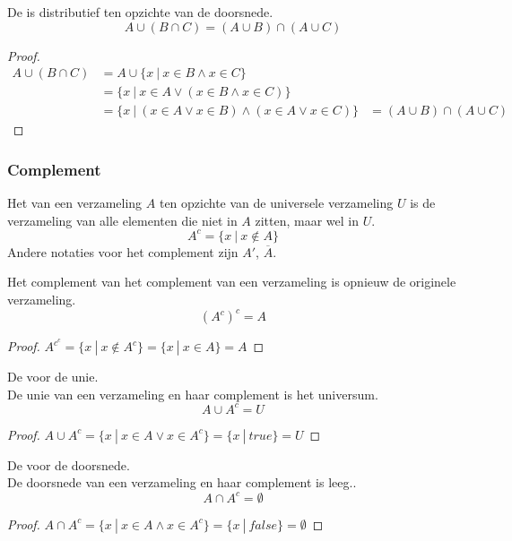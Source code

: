 \documentclass[main.tex]{subfiles}
\begin{document}
\begin{st}
  De  is distributief ten opzichte van de doorsnede.
  \[ A \cup ( B \cap C ) = (A \cup B) \cap (A \cup C) \]

  \begin{proof}
    \[
    \begin{array}{rll}
      A \cup ( B \cap C ) &= A \cup \{ x\ |\ x \in B \wedge x \in C \}&\\
                          &= \{ x\ |\ x \in A \vee (x \in B \wedge x \in C) \}&\\
                          &= \{ x\ |\ (x \in A \vee x\in B) \wedge (x \in A \vee x \in C) \} &= (A \cup B) \cap (A \cup C)      
    \end{array}
    \]
  \end{proof}
\end{st}

\subsubsection{Complement}
\label{sec:complement}

\begin{de}
  Het  van een verzameling $A$ ten opzichte van de universele verzameling $U$ is de verzameling van alle elementen die niet in $A$ zitten, maar wel in $U$.
  \[ A^{c} = \{ x\ |\ x \not\in A \} \]
  Andere notaties voor het complement zijn $A'$, $\overline{A}$. 
\end{de}

\begin{st}
  Het complement van het complement van een verzameling is opnieuw de originele verzameling.
  \[ (A^{c})^{c} = A\]
  \begin{proof}
    $A^{c^{c}} = \{ x\ |\ x \not\in A^{c} \} = \{ x\ |\ x \in A \} = A$
  \end{proof}
\end{st}

\begin{st}
  De  voor de unie.\\
  De unie van een verzameling en haar complement is het universum.
  \[ A \cup A^{c} = U \]
  \begin{proof}
    $A \cup A^{c} = \{ x\ |\ x \in A \vee x \in A^{c}\} = \{ x\ |\ true \} = U$
  \end{proof}
\end{st}

\begin{st}
  De  voor de doorsnede.\\
  De doorsnede van een verzameling en haar complement is leeg..
  \[ A \cap A^{c} = \emptyset \]

  \begin{proof}
    $A \cap A^{c} = \{ x\ |\ x \in A \wedge x \in A^{c} \} = \{ x\ |\ false \}= \emptyset$
  \end{proof}
\end{st}
\end{document}
